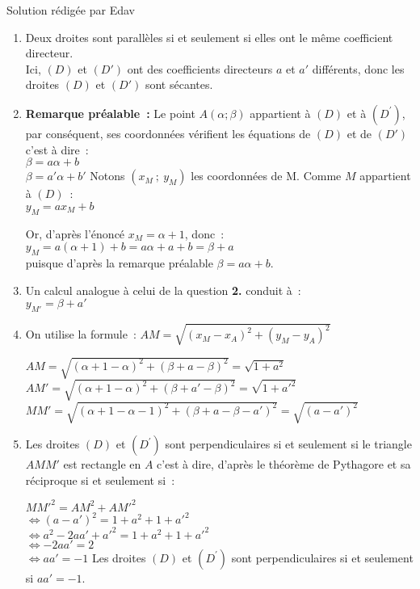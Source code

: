 \begin{corrige}

     Solution rédigée par Edav
\begin{enumerate}
     \item
Deux droites sont parallèles si et seulement si elles ont le même coefficient directeur.
\\
Ici, $ (D) $ et $ (D') $ ont des coefficients directeurs $ a$  et $ a' $ différents, donc les droites $ (D) $ et $ (D') $ sont sécantes.
     \item  \textbf{Remarque préalable~:} Le point $A(\alpha ; \beta)$ appartient à $(D)$ et à $(D^{\prime})$, par conséquent, ses coordonnées vérifient les équations de $ (D) $ et de $ (D') $ c'est à dire~:\\
$ \beta = a \alpha + b $ \\
$ \beta = a' \alpha + b' $ 
\medskip
Notons $ (x_M~;~y_M) $ les coordonnées de M. Comme $ M $ appartient à $ (D) $~:
\\
  $ y_M = a x_M + b $ 
\par
Or, d'après l'énoncé $ x_M = \alpha + 1 $, donc~:
\\
  $ y_M = a ( \alpha + 1 ) + b $\nosp$= a \alpha + a + b  $\nosp$= \beta + a $   
\\
puisque d'après  la remarque préalable $ \beta = a \alpha + b $.

\item 
Un calcul analogue à celui de la question  \textbf{2.} conduit à~:
\\
$ y_{M'} =  \beta + a' $   

\item
On utilise la formule~:
$ AM = \sqrt{ (x_M - x_A)^2  + (y_M - y_A)^2 } $
\par
$  AM = $\nosp$ \sqrt{ (\alpha + 1 - \alpha)^2  + (\beta + a - \beta )^2 } $\nosp$= \sqrt{ 1 + a^2 }  $
\\
$  AM' = $\nosp $ \sqrt{ (\alpha + 1 - \alpha)^2  + (\beta + a' - \beta )^2 }$\nosp$= \sqrt{ 1 + {a '} ^2 }  $
\\
$  MM' = $\nosp $ \sqrt{ (\alpha + 1 - \alpha - 1)^2  + (\beta + a - \beta - a' )^2 }$\nosp$= \sqrt{ (a - {a '}) ^2 }  $

\item
Les droites $(D)$ et $(D^{\prime})$ sont perpendiculaires si et seulement si le triangle $ AMM' $ est rectangle en $ A $ c'est à dire, d'après le théorème de Pythagore et sa réciproque si et seulement si~:
\par
$ {MM'}^2 = {AM}^2 + {AM'}^2 $  
\\
$  \Leftrightarrow  (a-a')^2 = 1+a^2 + 1+ {a'}^2$
\\
$  \Leftrightarrow  a^2 -2aa'+ {a'}^2 = 1+a^2 + 1+ {a'}^2$
\\
$  \Leftrightarrow   -2aa' = 2$
\\
$  \Leftrightarrow   aa' = -1$
\medskip
Les droites $(D)$ et $(D^{\prime})$ sont perpendiculaires si et seulement si $  aa' = -1 $.
\end{enumerate}
\end{corrige}


